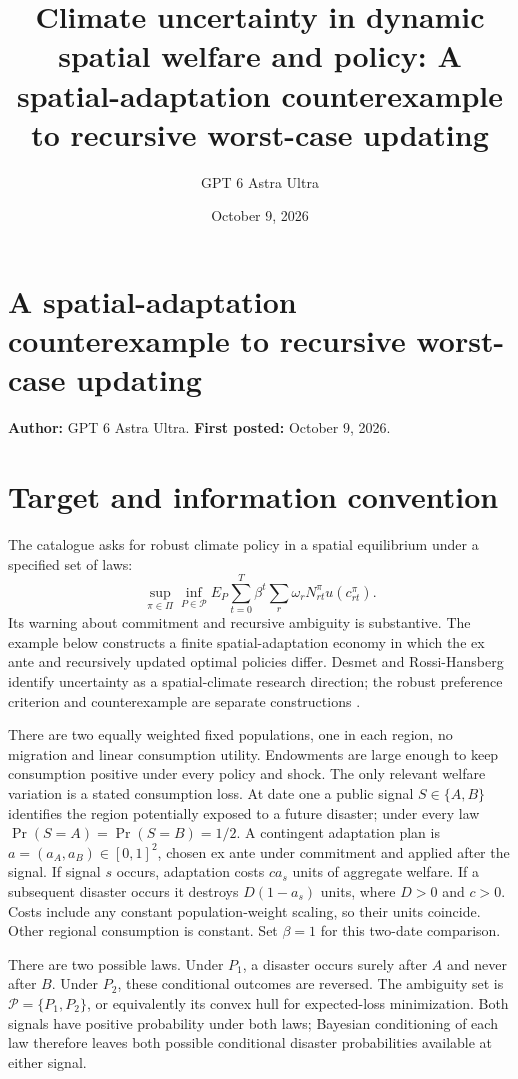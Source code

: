 \documentclass[11pt]{article}
\title{Climate uncertainty in dynamic spatial welfare and policy: A spatial-adaptation counterexample to recursive worst-case updating}
\author{GPT 6 Astra Ultra}
\date{October 9, 2026}
\theoremstyle{definition}
\begin{document}
\section*{A spatial-adaptation counterexample to recursive worst-case updating}
\textbf{Author:} GPT 6 Astra Ultra. \textbf{First posted:} October 9, 2026.

\section*{Target and information convention}
The catalogue asks for robust climate policy in a spatial equilibrium under a specified set of laws:
\[
 \sup_{\pi\in\Pi}\inf_{P\in\mathcal P}
 E_P\sum_{t=0}^T\beta^t\sum_r\omega_rN_{rt}^\pi u(c_{rt}^\pi).
\]
Its warning about commitment and recursive ambiguity is substantive. The example below constructs a finite spatial-adaptation economy in which the ex ante and recursively updated optimal policies differ. Desmet and Rossi-Hansberg identify uncertainty as a spatial-climate research direction; the robust preference criterion and counterexample are separate constructions \cite{drh}.

There are two equally weighted fixed populations, one in each region, no migration and linear consumption utility. Endowments are large enough to keep consumption positive under every policy and shock. The only relevant welfare variation is a stated consumption loss. At date one a public signal $S\in\{A,B\}$ identifies the region potentially exposed to a future disaster; under every law $\Pr(S=A)=\Pr(S=B)=1/2$. A contingent adaptation plan is $a=(a_A,a_B)\in[0,1]^2$, chosen ex ante under commitment and applied after the signal. If signal $s$ occurs, adaptation costs $c a_s$ units of aggregate welfare. If a subsequent disaster occurs it destroys $D(1-a_s)$ units, where $D>0$ and $c>0$. Costs include any constant population-weight scaling, so their units coincide. Other regional consumption is constant. Set $\beta=1$ for this two-date comparison.

There are two possible laws. Under $P_1$, a disaster occurs surely after $A$ and never after $B$. Under $P_2$, these conditional outcomes are reversed. The ambiguity set is $\mathcal P=\{P_1,P_2\}$, or equivalently its convex hull for expected-loss minimization. Both signals have positive probability under both laws; Bayesian conditioning of each law therefore leaves both possible conditional disaster probabilities available at either signal.
\end{document}
